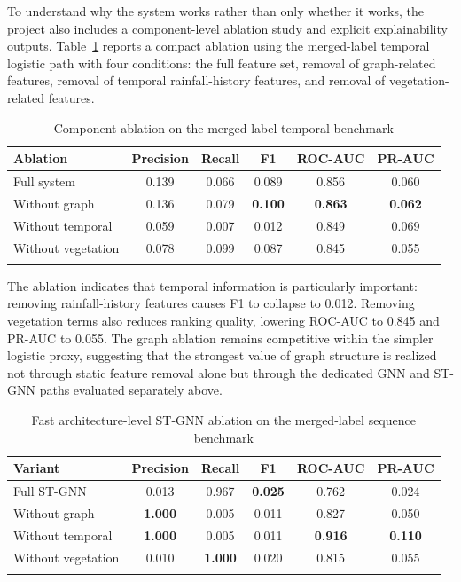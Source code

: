 \documentclass[pdflatex,sn-mathphys-num]{sn-jnl}
\begin{document}
To understand why the system works rather than only whether it works, the project also includes a component-level ablation study and explicit explainability outputs. Table~\ref{tab:ablation_results} reports a compact ablation using the merged-label temporal logistic path with four conditions: the full feature set, removal of graph-related features, removal of temporal rainfall-history features, and removal of vegetation-related features.

\begin{table}[h]
\caption{Component ablation on the merged-label temporal benchmark}
\label{tab:ablation_results}
\begin{tabular}{@{}lccccc@{}}
\toprule
Ablation & Precision & Recall & F1 & ROC-AUC & PR-AUC \\
\midrule
Full system & 0.139 & 0.066 & 0.089 & 0.856 & 0.060 \\
Without graph & 0.136 & 0.079 & \textbf{0.100} & \textbf{0.863} & \textbf{0.062} \\
Without temporal & 0.059 & 0.007 & 0.012 & 0.849 & 0.069 \\
Without vegetation & 0.078 & 0.099 & 0.087 & 0.845 & 0.055 \\
\botrule
\end{tabular}
\end{table}

The ablation indicates that temporal information is particularly important: removing rainfall-history features causes F1 to collapse to 0.012. Removing vegetation terms also reduces ranking quality, lowering ROC-AUC to 0.845 and PR-AUC to 0.055. The graph ablation remains competitive within the simpler logistic proxy, suggesting that the strongest value of graph structure is realized not through static feature removal alone but through the dedicated GNN and ST-GNN paths evaluated separately above.

\begin{table}[h]
\caption{Fast architecture-level ST-GNN ablation on the merged-label sequence benchmark}
\label{tab:st_ablation_fast}
\begin{tabular}{@{}lccccc@{}}
\toprule
Variant & Precision & Recall & F1 & ROC-AUC & PR-AUC \\
\midrule
Full ST-GNN & 0.013 & 0.967 & \textbf{0.025} & 0.762 & 0.024 \\
Without graph & \textbf{1.000} & 0.005 & 0.011 & 0.827 & 0.050 \\
Without temporal & \textbf{1.000} & 0.005 & 0.011 & \textbf{0.916} & \textbf{0.110} \\
Without vegetation & 0.010 & \textbf{1.000} & 0.020 & 0.815 & 0.055 \\
\botrule
\end{tabular}
\end{table}
\end{document}

